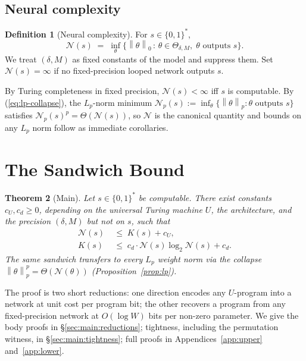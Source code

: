 \documentclass{article}
\newtheorem{theorem}{Theorem}
\theoremstyle{definition}
\newtheorem{definition}[theorem]{Definition}
\newcommand{\B}{\{0,1\}}
\newcommand{\norm}[1]{\left\lVert#1\right\rVert}
\newcommand{\nc}{\mathcal{N}}
\newcommand{\Param}{\Theta}
\begin{document}
\subsection{Neural complexity}

\begin{definition}[Neural complexity]\label{def:nc}
  For $s \in \B^*$,
  \[
    \nc(s) \;=\; \inf_\theta \bigl\{ \norm{\theta}_0 \,:\, \theta \in \Param_{\delta, M},\; \theta \text{ outputs } s \bigr\}.
  \]
  We treat $(\delta, M)$ as fixed constants of the model and suppress them. Set
  $\nc(s) = \infty$ if no fixed-precision looped network outputs $s$.
\end{definition}

By Turing completeness in fixed precision, $\nc(s) < \infty$ iff $s$ is
computable. By (\ref{eq:lp-collapse}), the $L_p$-norm minimum $\nc_p(s) :=
  \inf_\theta \{ \norm{\theta}_p : \theta \text{ outputs } s \}$ satisfies
$\nc_p(s)^p = \Theta(\nc(s))$, so $\nc$ is the canonical quantity and bounds on
any $L_p$ norm follow as immediate corollaries.

\section{The Sandwich Bound}\label{sec:main}

\begin{theorem}[Main]\label{thm:main}
  Let $s \in \B^*$ be computable. There exist constants $c_U, c_d \ge 0$,
  depending on the universal Turing machine $U$, the architecture, and the
  precision $(\delta, M)$ but not on $s$, such that
  \begin{align}
    \nc(s) & \;\le\; K(s) + c_U, \label{eq:upper}                           \\
    K(s)   & \;\le\; c_d \cdot \nc(s) \log_2 \nc(s) + c_d. \label{eq:lower}
  \end{align}
  The same sandwich transfers to every $L_p$ weight norm via the collapse
  $\norm{\theta}_p^p = \Theta(\nc(\theta))$ (Proposition~\ref{prop:lp}).
\end{theorem}

The proof is two short reductions: one direction encodes any $U$-program into a
network at unit cost per program bit; the other recovers a program from any
fixed-precision network at $O(\log W)$ bits per non-zero parameter. We give the
body proofs in \S\ref{sec:main:reductions}; tightness, including the
permutation witness, in \S\ref{sec:main:tightness}; full proofs in
Appendices~\ref{app:upper} and~\ref{app:lower}.
\end{document}
